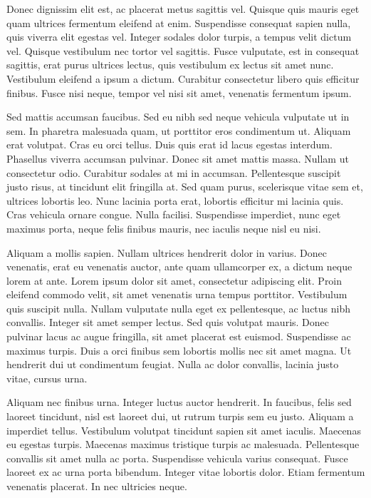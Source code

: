 Donec dignissim elit est, ac placerat metus sagittis vel. Quisque quis mauris eget quam ultrices fermentum eleifend at enim. Suspendisse consequat sapien nulla, quis viverra elit egestas vel. Integer sodales dolor turpis, a tempus velit dictum vel. Quisque vestibulum nec tortor vel sagittis. Fusce vulputate, est in consequat sagittis, erat purus ultrices lectus, quis vestibulum ex lectus sit amet nunc. Vestibulum eleifend a ipsum a dictum. Curabitur consectetur libero quis efficitur finibus. Fusce nisi neque, tempor vel nisi sit amet, venenatis fermentum ipsum.

Sed mattis accumsan faucibus. Sed eu nibh sed neque vehicula vulputate ut in sem. In pharetra malesuada quam, ut porttitor eros condimentum ut. Aliquam erat volutpat. Cras eu orci tellus. Duis quis erat id lacus egestas interdum. Phasellus viverra accumsan pulvinar. Donec sit amet mattis massa. Nullam ut consectetur odio. Curabitur sodales at mi in accumsan. Pellentesque suscipit justo risus, at tincidunt elit fringilla at. Sed quam purus, scelerisque vitae sem et, ultrices lobortis leo. Nunc lacinia porta erat, lobortis efficitur mi lacinia quis. Cras vehicula ornare congue. Nulla facilisi. Suspendisse imperdiet, nunc eget maximus porta, neque felis finibus mauris, nec iaculis neque nisl eu nisi.

Aliquam a mollis sapien. Nullam ultrices hendrerit dolor in varius. Donec venenatis, erat eu venenatis auctor, ante quam ullamcorper ex, a dictum neque lorem at ante. Lorem ipsum dolor sit amet, consectetur adipiscing elit. Proin eleifend commodo velit, sit amet venenatis urna tempus porttitor. Vestibulum quis suscipit nulla. Nullam vulputate nulla eget ex pellentesque, ac luctus nibh convallis. Integer sit amet semper lectus. Sed quis volutpat mauris. Donec pulvinar lacus ac augue fringilla, sit amet placerat est euismod. Suspendisse ac maximus turpis. Duis a orci finibus sem lobortis mollis nec sit amet magna. Ut hendrerit dui ut condimentum feugiat. Nulla ac dolor convallis, lacinia justo vitae, cursus urna.

Aliquam nec finibus urna. Integer luctus auctor hendrerit. In faucibus, felis sed laoreet tincidunt, nisl est laoreet dui, ut rutrum turpis sem eu justo. Aliquam a imperdiet tellus. Vestibulum volutpat tincidunt sapien sit amet iaculis. Maecenas eu egestas turpis. Maecenas maximus tristique turpis ac malesuada. Pellentesque convallis sit amet nulla ac porta. Suspendisse vehicula varius consequat. Fusce laoreet ex ac urna porta bibendum. Integer vitae lobortis dolor. Etiam fermentum venenatis placerat. In nec ultricies neque.

